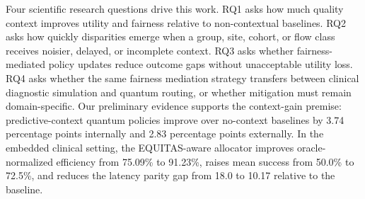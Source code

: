 \documentclass[conference]{IEEEtran}
\begin{document}
Four scientific research questions drive this work. RQ1 asks how much quality
context improves utility and fairness relative to non-contextual baselines.
RQ2 asks how quickly disparities emerge when a group, site, cohort, or flow
class receives noisier, delayed, or incomplete context. RQ3 asks whether
fairness-mediated policy updates reduce outcome gaps without unacceptable
utility loss. RQ4 asks whether the same fairness mediation strategy transfers
between clinical diagnostic simulation and quantum routing, or whether
mitigation must remain domain-specific. Our preliminary evidence supports the
context-gain premise: predictive-context quantum policies improve over
no-context baselines by 3.74 percentage points internally and 2.83 percentage
points externally. In the embedded clinical setting, the EQUITAS-aware
allocator improves oracle-normalized efficiency from 75.09\% to 91.23\%,
raises mean success from 50.0\% to 72.5\%, and reduces the latency parity gap
from 18.0 to 10.17 relative to the baseline.



\end{document}
